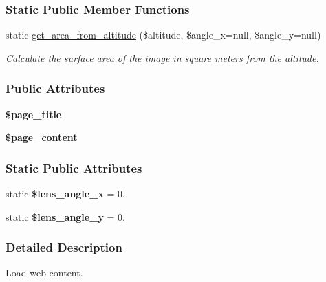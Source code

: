 \subsubsection*{Static Public Member Functions}
\begin{DoxyCompactItemize}
\item 
static \hyperlink{classWebStart_a0b7c4025f9e2528f567509b42ff91499}{get\-\_\-area\-\_\-from\-\_\-altitude} (\$altitude, \$angle\-\_\-x=null, \$angle\-\_\-y=null)
\begin{DoxyCompactList}\small\item\em Calculate the surface area of the image in square meters from the altitude. \end{DoxyCompactList}\end{DoxyCompactItemize}
\subsubsection*{Public Attributes}
\begin{DoxyCompactItemize}
\item 
\hypertarget{classWebStart_a440d4738eae58702e1c931e5bb7c0bdf}{{\bfseries \$page\-\_\-title}}\label{classWebStart_a440d4738eae58702e1c931e5bb7c0bdf}

\item 
\hypertarget{classWebStart_a8f40d903e95e1edf41bee61c889493de}{{\bfseries \$page\-\_\-content}}\label{classWebStart_a8f40d903e95e1edf41bee61c889493de}

\end{DoxyCompactItemize}
\subsubsection*{Static Public Attributes}
\begin{DoxyCompactItemize}
\item 
\hypertarget{classWebStart_a3a9d1d5875f7b533b40cf0a80e0fbfa2}{static {\bfseries \$lens\-\_\-angle\-\_\-x} = 0.}\label{classWebStart_a3a9d1d5875f7b533b40cf0a80e0fbfa2}

\item 
\hypertarget{classWebStart_a707a6295c4f949ed1590010b3b17a613}{static {\bfseries \$lens\-\_\-angle\-\_\-y} = 0.}\label{classWebStart_a707a6295c4f949ed1590010b3b17a613}

\end{DoxyCompactItemize}


\subsubsection{Detailed Description}
Load web content. 

